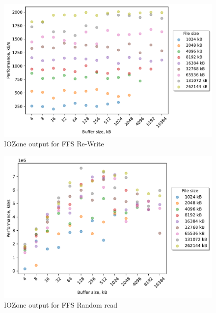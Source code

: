 \begin{figure}[!htb]
	\label{fig:bench_ffs_re_write}
	\begin{center}
		\includegraphics[width=1.0\textwidth]{figures.nosync/benchmarking/ffs/Re-Write.pdf}
	\end{center}
	\caption{IOZone output for FFS \mbox{Re-Write}}
\end{figure}

\begin{figure}[!htb]
	\label{fig:bench_ffs_rnd_read}
	\begin{center}
		\includegraphics[width=1.0\textwidth]{figures.nosync/benchmarking/ffs/Random read.pdf}
	\end{center}
	\caption{IOZone output for FFS Random read}
\end{figure}

